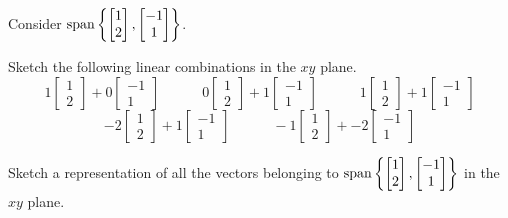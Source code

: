 \begin{applicationActivities}
\begin{activity}{10}
  Consider \(\operatorname{span}\left\{\begin{bmatrix}1\\2\end{bmatrix},
  \begin{bmatrix}-1\\1\end{bmatrix}\right\}\).
  \begin{subactivity}
    Sketch the following linear combinations in the \(xy\) plane.
    \[
    1\begin{bmatrix}1\\2\end{bmatrix}+
    0\begin{bmatrix}-1\\1\end{bmatrix}\hspace{3em}
    0\begin{bmatrix}1\\2\end{bmatrix}+
    1\begin{bmatrix}-1\\1\end{bmatrix}\hspace{3em}
    1\begin{bmatrix}1\\2\end{bmatrix}+
    1\begin{bmatrix}-1\\1\end{bmatrix}
    \]
    \[
    -2\begin{bmatrix}1\\2\end{bmatrix}+
    1\begin{bmatrix}-1\\1\end{bmatrix}\hspace{3em}
    -1\begin{bmatrix}1\\2\end{bmatrix}+
    -2\begin{bmatrix}-1\\1\end{bmatrix}
    \]
  \end{subactivity}
  \begin{subactivity}
    Sketch a representation of all the vectors belonging to
    \(\operatorname{span}\left\{\begin{bmatrix}1\\2\end{bmatrix},
     \begin{bmatrix}-1\\1\end{bmatrix}\right\}\)
    in the \(xy\) plane.
  \end{subactivity}
\end{activity}


\end{applicationActivities}
